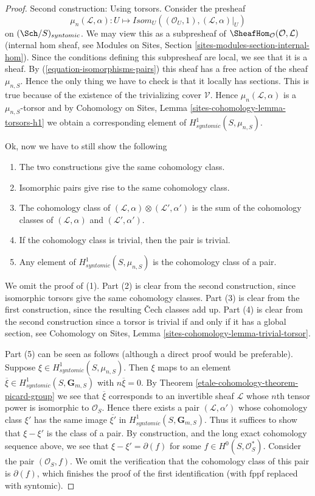 \begin{proof}
\medskip\noindent
Second construction: Using torsors. Consider the presheaf
$$
\mu_n(\mathcal{L}, \alpha) :
U
\longmapsto
\mathit{Isom}_U((\mathcal{O}_U, 1), (\mathcal{L}, \alpha)|_U)
$$
on $(\Sch/S)_{syntomic}$.
We may view this as a subpresheaf of
$\SheafHom_\mathcal{O}(\mathcal{O}, \mathcal{L})$ (internal hom
sheaf, see
Modules on Sites, Section \ref{sites-modules-section-internal-hom}).
Since the conditions defining this subpresheaf are local, we see that it is
a sheaf.
By (\ref{equation-isomorphisms-pairs}) this sheaf has a free action of
the sheaf $\mu_{n, S}$. Hence the only thing we have to check is that
it locally has sections. This is true because of the existence of the
trivializing cover $\mathcal{V}$. Hence $\mu_n(\mathcal{L}, \alpha)$
is a $\mu_{n, S}$-torsor and by
Cohomology on Sites, Lemma \ref{sites-cohomology-lemma-torsors-h1}
we obtain a corresponding element of $H^1_{syntomic}(S, \mu_{n, S})$.

\medskip\noindent
Ok, now we have to still show the following
\begin{enumerate}
\item The two constructions give the same cohomology class.
\item Isomorphic pairs give rise to the same cohomology class.
\item The cohomology class of
$(\mathcal{L}, \alpha) \otimes (\mathcal{L}', \alpha')$
is the sum of the cohomology classes of
$(\mathcal{L}, \alpha)$ and $(\mathcal{L}', \alpha')$.
\item If the cohomology class is trivial, then the pair is trivial.
\item Any element of $H^1_{syntomic}(S, \mu_{n, S})$ is the
cohomology class of a pair.
\end{enumerate}
We omit the proof of (1). Part (2) is clear from the second construction,
since isomorphic torsors give the same cohomology classes.
Part (3) is clear from the first construction, since the resulting
{\v C}ech classes add up. Part (4) is clear from the second construction
since a torsor is trivial if and only if it has a global section, see
Cohomology on Sites, Lemma \ref{sites-cohomology-lemma-trivial-torsor}.

\medskip\noindent
Part (5) can be seen as follows (although a direct proof would be
preferable). Suppose $\xi \in H^1_{syntomic}(S, \mu_{n, S})$.
Then $\xi$ maps to an element
$\overline{\xi} \in H^1_{syntomic}(S, \mathbf{G}_{m, S})$
with $n \overline{\xi} = 0$. By
Theorem \ref{etale-cohomology-theorem-picard-group}
we see that $\overline{\xi}$ corresponds to an invertible sheaf $\mathcal{L}$
whose $n$th tensor power is isomorphic to $\mathcal{O}_S$.
Hence there exists a pair $(\mathcal{L}, \alpha')$ whose cohomology
class $\xi'$ has the same image $\overline{\xi'}$ in
$H^1_{syntomic}(S, \mathbf{G}_{m, S})$. Thus it suffices to show
that $\xi - \xi'$ is the class of a pair. By construction, and the
long exact cohomology sequence above, we see that
$\xi - \xi' = \partial(f)$ for some $f \in H^0(S, \mathcal{O}_S^*)$.
Consider the pair $(\mathcal{O}_S, f)$. We omit the verification
that the cohomology class of this pair is $\partial(f)$, which
finishes the proof of the first identification (with fppf replaced
with syntomic).


\end{proof}
